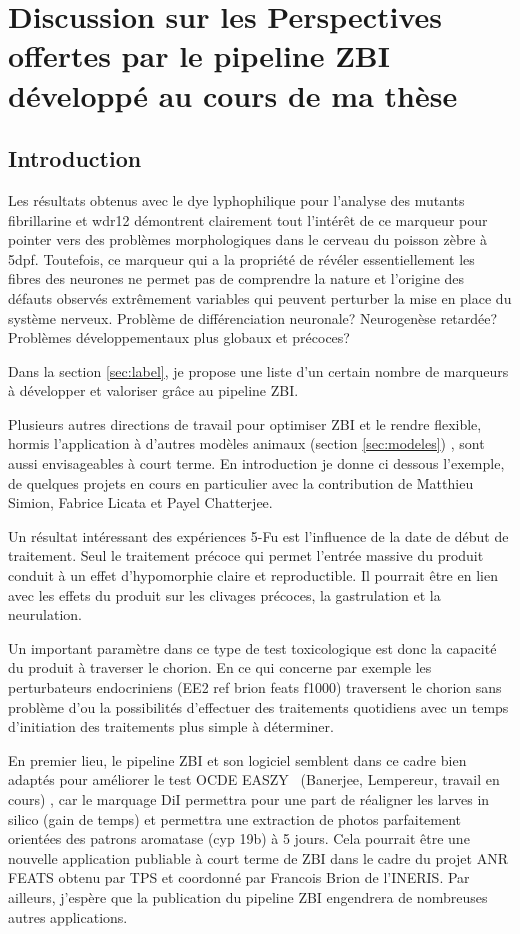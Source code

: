 \documentclass[\main/main.tex]{subfiles}
\begin{document}
\section{Discussion sur les Perspectives offertes par le pipeline ZBI développé au cours de ma thèse}
%
\subsection{Introduction}
   
%
Les résultats obtenus avec le dye lyphophilique pour l'analyse des mutants fibrillarine et wdr12 démontrent clairement tout l'intérêt de ce marqueur pour pointer vers des problèmes morphologiques dans le cerveau du poisson zèbre à 5dpf.
%
Toutefois, ce marqueur qui a la propriété de révéler essentiellement les fibres des neurones ne permet pas de comprendre la nature et l'origine des défauts observés extrêmement variables qui peuvent perturber la mise en place du système nerveux.
%
Problème de différenciation neuronale? Neurogenèse retardée? Problèmes développementaux plus globaux et précoces? 

%
Dans la section \ref{sec:label}, je propose une liste d'un certain nombre de marqueurs à développer et valoriser grâce au pipeline ZBI.

%
Plusieurs autres directions de travail pour optimiser ZBI et le rendre flexible, hormis l'application à d'autres modèles animaux (section \ref{sec:modeles}) , sont aussi envisageables à court terme. En introduction je donne ci dessous l'exemple, de quelques projets en cours en particulier avec la contribution de Matthieu Simion, Fabrice Licata et Payel Chatterjee. 

%
Un résultat intéressant des expériences 5-Fu est l'influence de la date de début de traitement.
%
Seul le traitement précoce qui permet l'entrée massive du produit conduit à un effet d'hypomorphie claire et reproductible. Il pourrait être en lien avec les  effets du produit sur les clivages précoces, la gastrulation et la neurulation.

%
Un important paramètre dans ce type de test toxicologique  est donc la capacité du produit à traverser le chorion. En ce qui concerne par exemple les perturbateurs endocriniens (EE2 ref brion feats f1000) traversent le chorion sans problème d'ou la possibilités d'effectuer des traitements quotidiens avec un temps d'initiation des traitements  plus simple à déterminer.

En premier lieu, le pipeline ZBI et son logiciel semblent dans ce cadre  bien  adaptés pour améliorer le test OCDE EASZY~\cite{brion_2019} (Banerjee, Lempereur, travail en cours) , car le marquage DiI permettra pour une part de réaligner les larves in silico (gain de temps) et permettra une extraction de photos parfaitement orientées des patrons aromatase (cyp 19b) à 5 jours. Cela pourrait être une nouvelle application publiable à court terme de ZBI dans le cadre du projet ANR FEATS obtenu par TPS et coordonné par Francois Brion de l'INERIS. Par ailleurs, j'espère que la publication du pipeline ZBI engendrera de nombreuses autres applications.
\end{document}
